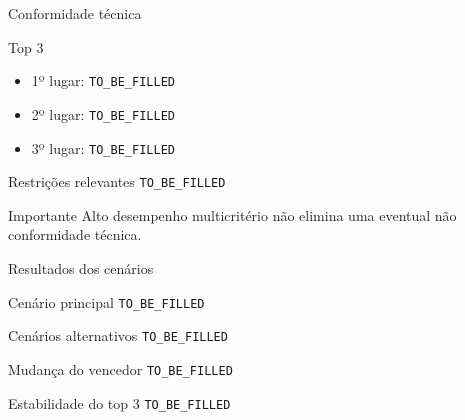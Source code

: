 
\begin{frame}{Conformidade técnica}

    \begin{block}{Top 3}
        \begin{itemize}
            \item 1º lugar:
                  \texttt{TO\_BE\_FILLED}

            \item 2º lugar:
                  \texttt{TO\_BE\_FILLED}

            \item 3º lugar:
                  \texttt{TO\_BE\_FILLED}
        \end{itemize}
    \end{block}

    \vspace{0.3cm}

    \begin{block}{Restrições relevantes}
        \texttt{TO\_BE\_FILLED}
    \end{block}

    \vspace{0.2cm}

    \begin{alertblock}{Importante}
        Alto desempenho multicritério não elimina uma eventual
        não conformidade técnica.
    \end{alertblock}

\end{frame}



\begin{frame}{Resultados dos cenários}

    \begin{block}{Cenário principal}
        \texttt{TO\_BE\_FILLED}
    \end{block}

    \vspace{0.2cm}

    \begin{block}{Cenários alternativos}
        \texttt{TO\_BE\_FILLED}
    \end{block}

    \vspace{0.2cm}

    \begin{block}{Mudança do vencedor}
        \texttt{TO\_BE\_FILLED}
    \end{block}

    \vspace{0.2cm}

    \begin{block}{Estabilidade do top 3}
        \texttt{TO\_BE\_FILLED}
    \end{block}

\end{frame}


